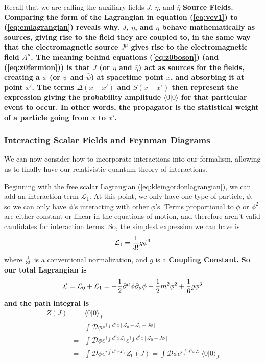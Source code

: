 \documentclass[12pt,epsf]{article}
\def\nolabel{\nonumber }
\def\nolabel{\nonumber }
\begin{document}
Recall that we are calling the auxiliary fields $J$, $\eta$, and $\bar
\eta$ \bf Source Fields\rm.  Comparing the form of the Lagrangian in
equation (\ref{eq:vev1}) to (\ref{eq:emlagrangian}) reveals why.  $J$,
$\eta$, and $\bar \eta$ behave mathematically as sources, giving rise
to the field they are coupled to, in the same way that the
electromagnetic source $J^{\mu}$ gives rise to the electromagnetic
field $A^{\mu}$.  The meaning behind equations (\ref{eq:z0boson}) (and
(\ref{eq:z0fermion})) is that $J$ (or $\eta$ and $\bar \eta$) act as
sources for the fields, creating a $\phi$ (or $\psi$ and $\bar \psi$)
at spacetime point $x$, and absorbing it at point $x'$.  The terms
$\Delta(x-x')$ and $S(x-x')$ then represent the expression giving the
probability amplitude $\langle 0 | 0 \rangle$ for that particular event
to occur.  In other words, the propagator is the statistical weight of
a particle going from $x$ to $x'$.  

\subsubsection{Interacting Scalar Fields and Feynman Diagrams}
\label{sec:feynmandiag}

We can now consider how to incorporate interactions into our formalism,
allowing us to finally have our relativistic quantum theory of
interactions.  

Beginning with the free scalar Lagrangian
(\ref{eq:kleingordonlagrangian}), we can add an interaction term
$\mathcal{L}_1$.  At this point, we only have one type of particle,
$\phi$, so we can only have $\phi$'s interacting with other $\phi$'s. 
Terms proportional to $\phi$ or $\phi^2$ are either constant or linear
in the equations of motion, and therefore aren't valid candidates for
interaction terms.  So, the simplest expression we can have is 
\begin{eqnarray}
\mathcal{L}_1 = {1\over 3!} g \phi^3\nolabel
\end{eqnarray}
where ${1\over 3!}$ is a conventional normalization, and $g$ is a \bf
Coupling Constant\rm.  So our total Lagrangian is 
\begin{eqnarray}
\mathcal{L} = \mathcal{L}_0 + \mathcal{L}_1 = -{1\over 2}
\partial^{\mu} \phi \partial_{\mu} \phi - {1\over 2} m^2 \phi^2 +
{1\over 6}g \phi^3\nolabel
\end{eqnarray}
and the path integral is
\begin{eqnarray}
Z(J) &=& \langle 0 | 0 \rangle_J \nolabel \\
&=& \int \mathcal{D}\phi e^{i \int d^4x [\mathcal{L}_0 + \mathcal{L}_1
+ J\phi]} \nolabel \\
&=& \int \mathcal{D}\phi e^{i\int d^4x \mathcal{L}_1}e^{i \int d^4x
[\mathcal{L}_0 + J \phi]} \nolabel \\
&=& \int \mathcal{D}\phi e^{i\int d^4x \mathcal{L}_1} Z_0(J) = \int
\mathcal{D}\phi e^{i\int d^4x\mathcal{L}_1} \langle 0 | 0
\rangle_J\nolabel
\end{eqnarray}
\end{document}
